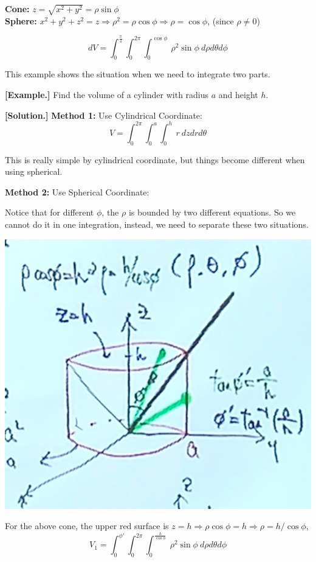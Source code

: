 \documentclass[11pt, a4paper]{MATH2023}
\newcommand{\eg}{\textbf{[Example.] }}
\newcommand{\sol}{\textbf{[Solution.] }}
\begin{document}
\begin{spacing}{1.3}
    {\bf Cone:} $z=\sqrt{x^2+y^2}=\rho \sin\phi$\\
    {\bf Sphere:} $x^2+y^2+z^2=z \Rightarrow \rho^2 = \rho \cos\phi \Rightarrow \rho=\cos\phi$, (since $\rho\ne 0$)

    $$dV=\int_0^{\frac{\pi}{4}} \int_0^{2\pi} \int_0^{\cos\phi}\ \rho^2 \sin\phi \ d\rho d\theta d\phi$$

    \newpage
    {\blue This example shows the situation when we need to integrate two parts.}

    \eg Find the volume of a cylinder with radius $a$ and height $h$.

    \sol {\bf Method 1:} Use Cylindrical Coordinate: 
    $$V=\int_0^{2\pi} \int_0^a \int_0^h\ r\ dzdrd\theta$$

    This is really simple by cylindrical coordinate, but things become different when using spherical.

    {\bf Method 2:} Use Spherical Coordinate: 

    Notice that for different $\phi$, the $\rho$ is bounded by two different equations.
    So we cannot do it in one integration, instead, we need to separate these two situations.
    \begin{center}
        \includegraphics[scale=0.25]{images/Ch14-int-sphere-cylinder.JPG}
    \end{center}
    For the above cone, the upper red surface is $z=h\Rightarrow \rho\cos\phi=h\Rightarrow \rho=h/{\cos\phi}$,
    $$V_1=\int_0^{\phi'}\int_0^{2\pi}\int_0^{\frac{h}{\cos\phi}}\ \rho^2\sin\phi\ d\rho d\theta d\phi$$


\end{spacing}
\end{document}
